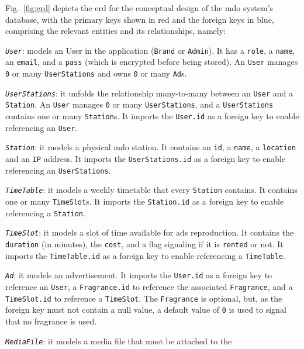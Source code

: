 Fig.~\ref{fig:erd} depicts the \gls{erd} for the conceptual design of the
\gls{mdo} system's database,
with the primary keys shown in red and the foreign keys in blue,
comprising the relevant entities and its relationships, namely:
\begin{item-c}
\item
  \emph{\texttt{User}}:
  models an User in the application (\texttt{Brand} or \texttt{Admin}). It has a
  \texttt{role}, a \texttt{name}, an \texttt{email}, and a \texttt{pass} (which
  is encrypted before being stored). An \texttt{User} manages \texttt{0} or many
  \texttt{UserStations} and owns \texttt{0} or many \texttt{Ad}s.
\item
  \emph{\texttt{UserStations}}: it unfolds the relationship many-to-many between
  an \texttt{User} and a \texttt{Station}. An \texttt{User} manages \texttt{0}
  or many \texttt{UserStations}, and a \texttt{UserStations} contains one or
  many \texttt{Station}s. It imports the \texttt{User.id} as a foreign key to
  enable referencing an \texttt{User}.
\item
  \emph{\texttt{Station}}: it models a physical \gls{mdo} station. It contains
  an \texttt{id}, a \texttt{name}, a \texttt{location} and an \texttt{IP}
  address. It imports the \texttt{UserStations.id} as a foreign key to
  enable referencing an \texttt{UserStations}.
\item
  \emph{\texttt{TimeTable}}: it models a weekly timetable that every
  \texttt{Station} contains. It contains one or many \texttt{TimeSlot}s.
  It imports the \texttt{Station.id} as a foreign key to
  enable referencing a \texttt{Station}.
\item
  \emph{\texttt{TimeSlot}}: it models a slot of time available for ads
  reproduction. It contains the \texttt{duration} (in minutes), the
  \texttt{cost}, and a flag signaling if it is \texttt{rented} or not. It
  imports the \texttt{TimeTable.id} as a foreign key to enable referencing a
  \texttt{TimeTable}.
\item
  \emph{\texttt{Ad}}: it models an advertisement.
  It imports the \texttt{User.id} as a foreign key to reference an
  \texttt{User}, a \texttt{Fragrance.id} to reference the associated
  \texttt{Fragrance}, and a \texttt{TimeSlot.id} to reference a
  \texttt{TimeSlot}. The \texttt{Fragrance} is optional, but, as the foreign key
  must not contain a null value, a default value of \texttt{0} is used to signal
  that no fragrance is used.
\item
  \emph{\texttt{MediaFile}}: it models a media file that must be attached to the

\end{item-c}
